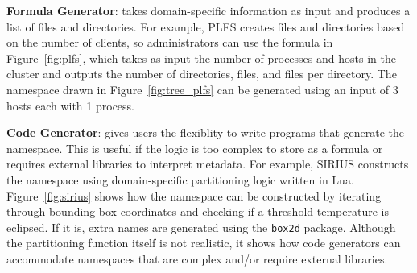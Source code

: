 

\textbf{Formula Generator}: takes domain-specific information as input and
produces a list of files and directories.  For example, PLFS creates files and
directories based on the number of clients, so administrators can use the
formula in Figure~\ref{fig:plfs}, which takes as input the number of processes
and hosts in the cluster and outputs the number of directories, files, and
files per directory.  The namespace drawn in Figure~\ref{fig:tree_plfs} can be
generated using an input of 3 hosts each with 1 process. 


\textbf{Code Generator}: gives users the flexiblity to write programs that
generate the namespace. This is useful if the logic is too complex to store as
a formula or requires external libraries to interpret metadata. For example,
SIRIUS constructs the namespace using domain-specific partitioning logic
written in Lua.  Figure~\ref{fig:sirius} shows how the namespace can be
constructed by iterating through  bounding box coordinates and checking if a
threshold temperature is eclipsed. If it is, extra names are generated using
the \texttt{box2d} package.  Although the partitioning function itself is not
realistic, it shows how code generators can accommodate namespaces that are
complex and/or require external libraries.  

